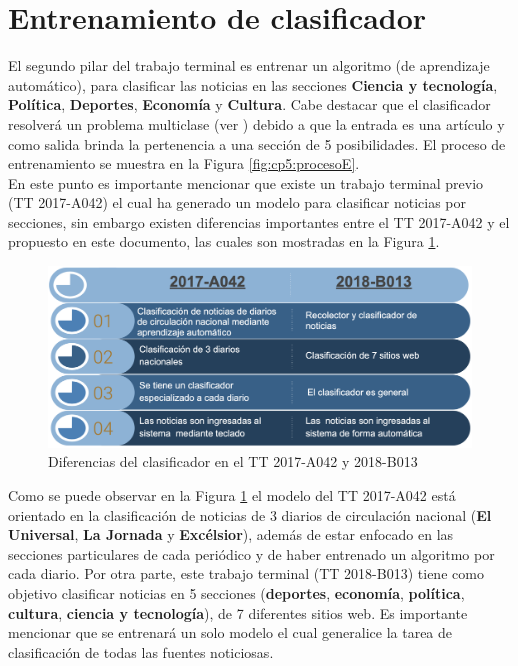 \section{Entrenamiento de clasificador}

El segundo pilar del trabajo terminal es entrenar un algoritmo (de aprendizaje automático), para clasificar las noticias en las secciones \textbf{Ciencia y tecnología}, \textbf{Política}, \textbf{Deportes}, \textbf{Economía} y \textbf{Cultura}. Cabe destacar que el clasificador resolverá un problema multiclase (ver ) debido a que la entrada es una artículo y como salida brinda la pertenencia a una sección  de 5 posibilidades. El proceso de entrenamiento se muestra en la Figura \ref{fig:cp5:procesoE}.\\



En este punto es importante mencionar que existe un trabajo terminal previo (TT 2017-A042) el cual ha generado un modelo para clasificar noticias por secciones, sin embargo existen diferencias importantes entre el TT 2017-A042 y el propuesto en este documento, las cuales son mostradas en la Figura \ref{cp5:diferenciastt}.



\begin{figure}[h]
\centering
\includegraphics[scale=0.35]{imagenes/capitulo5/entrenamiento/diferenciastt.png}
\caption{Diferencias del clasificador en el TT 2017-A042 y 2018-B013}
\label{cp5:diferenciastt}
\end{figure} 

Como se puede observar en la Figura \ref{cp5:diferenciastt} el modelo del TT 2017-A042 está orientado en la clasificación de noticias de 3 diarios de circulación nacional (\textbf{El Universal}, \textbf{La Jornada} y \textbf{Excélsior}), además de estar enfocado en las secciones particulares de cada periódico y de haber entrenado un algoritmo por cada diario. Por otra parte, este trabajo terminal (TT 2018-B013) tiene como objetivo clasificar noticias en 5 secciones (\textbf{deportes}, \textbf{economía}, \textbf{política}, \textbf{cultura}, \textbf{ciencia y tecnología}), de 7 diferentes sitios web. Es importante mencionar que se entrenará un solo modelo el cual generalice la tarea de clasificación de todas las fuentes noticiosas.\\  


